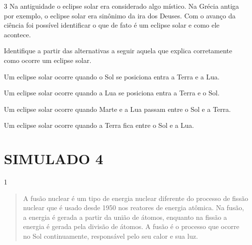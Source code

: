 {{\num{3}
  Na antiguidade o eclipse solar era considerado algo místico. Na Grécia
  antiga por exemplo, o eclipse solar era sinônimo da ira dos Deuses.
  Com o avanço da ciência foi possível identificar o que de fato é um
  eclipse solar e como ele acontece.


Identifique a partir das alternativas a seguir aquela que explica
corretamente como ocorre um eclipse solar.

\begin{escolha}
\item
  Um eclipse solar ocorre quando o Sol se posiciona entra a Terra e a
  Lua.
\item
  Um eclipse solar ocorre quando a Lua se posiciona entra a Terra e o
  Sol.
\item
  Um eclipse solar ocorre quando Marte e a Lua passam entre o Sol e a
  Terra.
\item
  Um eclipse solar ocorre quando a Terra fica entre o Sol e a Lua.
\end{escolha}


\chapter{SIMULADO 4}

\num{1}
\begin{quote}
  A fusão nuclear é um tipo de energia nuclear diferente do processo
  de fissão nuclear que é usado desde 1950 nos reatores de energia
  atômica. Na fusão, a energia é gerada a partir da união de átomos,
  enquanto na fissão a energia é gerada pela divisão de átomos. A fusão
  é o processo que ocorre no Sol continuamente, responsável pelo seu
  calor e sua luz.


\end{quote}}}
